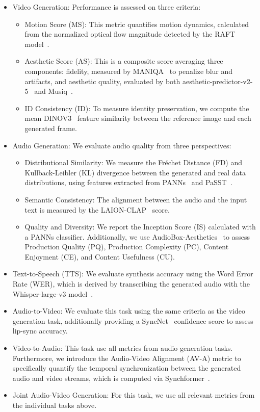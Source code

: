 \begin{itemize}[leftmargin=*]
    \item Video Generation: Performance is assessed on three criteria:
    \begin{itemize}
        \item Motion Score (MS): This metric quantifies motion dynamics, calculated from the normalized optical flow magnitude detected by the RAFT model~\cite{teed2020raft}.
        \item Aesthetic Score (AS): This is a composite score averaging three components: fidelity, measured by MANIQA~\cite{yang2022maniqa} to penalize blur and artifacts, and aesthetic quality, evaluated by both aesthetic-predictor-v2-5~\cite{aesthetic-predictor-v2-5} and Musiq~\cite{ke2021musiq}.
        \item ID Consistency (ID): To measure identity preservation, we compute the mean DINOV3~\cite{simeoni2025dinov3} feature similarity between the reference image and each generated frame.
    \end{itemize} 
        
    \item Audio Generation: We evaluate audio quality from three perspectives:
    \begin{itemize}
        \item Distributional Similarity: We measure the Fréchet Distance (FD) and Kullback-Leibler (KL) divergence between the generated and real data distributions, using features extracted from PANNs~\cite{kong2020panns} and PaSST~\cite{koutini2021efficient}.
        \item Semantic Consistency: The alignment between the audio and the input text is measured by the LAION-CLAP~\cite{wu2023large} score.
        \item Quality and Diversity: We report the Inception Score (IS) calculated with a PANNs classifier. Additionally, we use AudioBox-Aesthetics~\cite{tjandra2025meta} to assess Production Quality (PQ), Production Complexity (PC), Content Enjoyment (CE), and Content Usefulness (CU).
    \end{itemize}
    \item Text-to-Speech (TTS): We evaluate synthesis accuracy using the Word Error Rate (WER), which is derived by transcribing the generated audio with the Whisper-large-v3 model~\cite{radford2023robust}.
    \item Audio-to-Video: We evaluate this task using the same criteria as the video generation task, additionally providing a SyncNet~\cite{chung2016out} confidence score to assess lip-sync accuracy.
    \item Video-to-Audio: This task use all metrics from audio generation tasks. Furthermore, we introduce the Audio-Video Alignment (AV-A) metric to specifically quantify the temporal synchronization between the generated audio and video streams, which is computed via Synchformer~\cite{iashin2024synchformer}.
    \item Joint Audio-Video Generation: For this task, we use all relevant metrics from the individual tasks above. 
\end{itemize}

